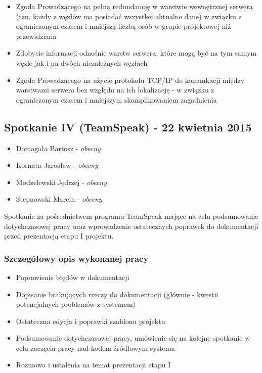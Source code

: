 \begin{itemize}
\item Zgoda Prowadzącego na pełną redundancję w warstwie wewnętrznej serwera (tzn. każdy z węzłów ma posiadać wszystkei aktualne dane) w związku z ograniczonym czasem i mniejszą liczbą osób w grupie projektowej niż przewidziana
\item Zdobycie informacji odnośnie warstw serwera, które mogą być na tym samym węźle jak i na dwóch niezależnych węzłach
\item Zgoda Prowadzącego na użycie protokołu TCP/IP do komunkacji między warstwami serwera bez względu na ich lokalizację - w związku z ograniczonym czasem i mniejszym skomplikowaniem zagadnienia
\end{itemize}

\subsection[Spotkanie IV - 22 kwietnia 2015]{Spotkanie IV (TeamSpeak) - 22 kwietnia 2015}

\begin{itemize}
\item Domagała Bartosz - \textit{obecny}
\item Kornata Jarosław - \textit{obecny}
\item Modzelewski Jędrzej - \textit{obecny}
\item Stepnowski Marcin - \textit{obecny}
\end{itemize}

\par{Spotkanie za pośrednictwem programu TeamSpeak mające na celu podsumowanie dotychczasowej pracy oraz wprowadzenie ostatecznych poprawek do dokumentacji przed prezentacją etapu I projektu.}

\subsubsection*[Szczegółowy opis wykonanej pracy]{Szczegółowy opis wykonanej pracy}
\begin{itemize}
\item Poprawienie błędów w dokumentacji
\item Dopisanie brakujących rzeczy do dokumentacji (głównie - kwestii potencjalnych problemów z systemem)
\item Ostateczna edycja i poprawki szablonu projektu
\item Podsumowanie dotychczasowej pracy, umówienie się na kolejne spotkanie w celu zaczęcia pracy nad kodem źródłowym systemu
\item Rozmowa i ustalenia na temat prezentacji etapu I
\end{itemize}